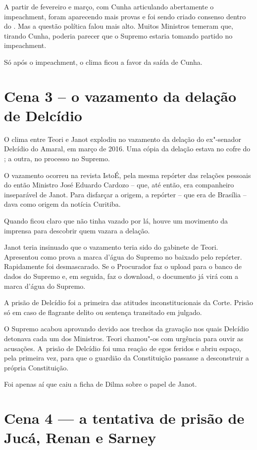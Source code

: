 A partir de fevereiro e março, com Cunha articulando abertamente o
impeachment, foram aparecendo mais provas e foi sendo criado consenso
dentro do . Mas a questão política falou mais alto. Muitos Ministros
temeram que, tirando Cunha, poderia parecer que o Supremo estaria
tomando partido no impeachment.

Só após o impeachment, o clima ficou a favor da saída de Cunha.

\section{Cena 3 -- o vazamento da delação de Delcídio}

O clima entre Teori e Janot explodiu no vazamento da delação do
ex"-senador Delcídio do Amaral, em março de 2016. Uma cópia da delação
estava no cofre do ; a outra, no processo no Supremo.

O vazamento ocorreu na revista IstoÉ, pela mesma repórter das relações
pessoais do então Ministro José Eduardo Cardozo -- que, até então, era
companheiro inseparável de Janot. Para disfarçar a origem, a repórter --
que era de Brasília -- dava como origem da notícia Curitiba.

Quando ficou claro que não tinha vazado por lá, houve um movimento da
imprensa para descobrir quem vazara a delação.

Janot teria insinuado que o vazamento teria sido do gabinete de Teori.
Apresentou como prova a marca d'água do Supremo no  baixado pelo
repórter. Rapidamente foi desmascarado. Se o Procurador faz o upload
para o banco de dados do Supremo e, em seguida, faz o download, o
documento já virá com a marca d'água do Supremo.

A prisão de Delcídio foi a primeira das atitudes inconstitucionais da
Corte. Prisão só em caso de flagrante delito ou sentença transitado em
julgado.

O Supremo acabou aprovando devido aos trechos da gravação nos quais
Delcídio detonava cada um dos Ministros. Teori chamou"-os com urgência
para ouvir as acusações. A~prisão de Delcídio foi uma reação de egos
feridos e abriu espaço, pela primeira vez, para que o guardião da
Constituição passasse a desconstruir a própria Constituição.

Foi apenas aí que caiu a ficha de Dilma sobre o papel de Janot.

\section{Cena 4 --- a tentativa de prisão de Jucá, Renan e Sarney}

